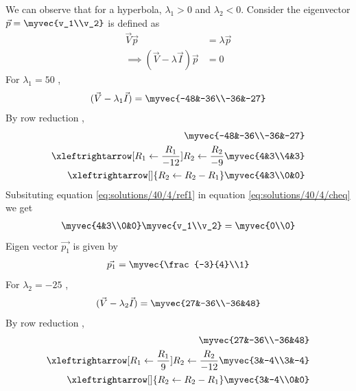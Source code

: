 We can observe that for a hyperbola, $\lambda_1>0$ and  $\lambda_2<0$.
Consider the eigenvector $\vec{p}=\myvec{v_1\\v_2}$ is defined as 
\begin{align}
    \vec{V}\vec{p}&=\lambda\vec{p}\\
    \implies (\vec{V}-\lambda\vec{I})\vec{p}&=0\label{eq:solutions/40/4/cheq}
\end{align}
For $\lambda_1=50$ ,
\begin{align}
    (\vec{V}-\lambda_1\vec{I})=\myvec{-48&-36\\-36&-27}
\end{align}
By row reduction , 
\begin{align}
    \myvec{-48&-36\\-36&-27}\\
    \xleftrightarrow[R_1\leftarrow\frac{R_1}{-12}]{R_2\leftarrow\frac{R_2}{-9}}\myvec{4&3\\4&3}\\
    \xleftrightarrow[]{R_2\leftarrow R_2-R_1}
    \myvec{4&3\\0&0}\label{eq:solutions/40/4/ref1}
\end{align}
Subsituting equation \eqref{eq:solutions/40/4/ref1} in equation \eqref{eq:solutions/40/4/cheq} we get
\begin{align}
        \myvec{4&3\\0&0}\myvec{v_1\\v_2}=\myvec{0\\0}\label{eq:solutions/40/4/eig1}
\end{align}
Eigen vector $\vec{p_1}$ is given by
\begin{align}
    \vec{p_1}=\myvec{\frac{-3}{4}\\1}\label{eq:solutions/40/4/ev1}
\end{align}
For $\lambda_2=-25$ ,
\begin{align}
    (\vec{V}-\lambda_2\vec{I})=\myvec{27&-36\\-36&48}
\end{align}
By row reduction , 
\begin{align}
    \myvec{27&-36\\-36&48}\\
    \xleftrightarrow[R_1\leftarrow\frac{R_1}{9}]
    {R_2\leftarrow\frac{R_2}{-12}}
    \myvec{3&-4\\3&-4}\\
    \xleftrightarrow[]{R_2\leftarrow R_2-R_1}
    \myvec{3&-4\\0&0}\label{eq:solutions/40/4/ref2}
\end{align} 
